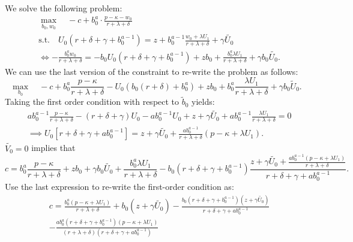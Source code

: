 \documentclass[12pt]{article} %
\theoremstyle{definition}
\begin{document}
\begin{appendix}
\noindent We solve the following problem:  
\begin{align*}
& \max_{b_0,w_0} \quad -c + b_0^a \cdot \frac{p-\kappa-w_0}{r+\lambda+\delta} \\
& \text{s.t.} \quad U_0(r+\delta+\gamma+b_0^{a-1}) = z + b_0^{a-1} \frac{w_0+\lambda U_1}{r+\lambda+\delta} + \gamma \tilde{U_0} \\
& \iff - \frac{b_0^{a}w_0}{r+\lambda+\delta} = - b_0 U_0(r+\delta+\gamma+b_0^{a-1}) + zb_0 +  \frac{b_0^{a} \lambda U_1}{r+\lambda+\delta} +  \gamma b_0 \tilde{U_0}.    
\end{align*}
We can use the last version of the constraint to re-write the problem as follows: 
\begin{equation*}
\max_{b_0} \quad -c + b_0^a \frac{p-\kappa}{r+\lambda+\delta} - U_0(b_0(r+
\delta)+b_0^a) +  zb_0 +b_0^a \frac{\lambda U_1}{r+\lambda+\delta} + \gamma b_0 \tilde{U}_0.
\end{equation*}
Taking the first order condition with respect to $\tilde{b}_0$ yields: 
\begin{align*}
& a b_0^{a-1}\frac{p-\kappa}{r+\lambda+\delta} - (r+\delta+\gamma) U_0 - a b_0^{a-1}U_0 + z + \gamma \tilde{U_0} + ab_0^{a-1} \frac{\lambda U_1}{r+\lambda+\delta} = 0 \\
& \implies U_0[r+\delta+\gamma+ab_0^{a-1}] = z + \gamma \tilde{U_0} + \frac{a b_0^{a-1}}{r+\lambda+\delta}(p-\kappa+\lambda U_1). 
\end{align*}
$\tilde{V_0}=0$ implies that
\begin{equation*}
 c =  b_0^{a} \frac{p-\kappa}{r+\lambda+\delta} + z b_0 + \gamma b_0 \tilde{U_0} + \frac{b_0^{a}\lambda U_1}{r+\lambda+\delta} -b_0(r+\delta+\gamma+b_0^{a-1}) \frac{z+\gamma \tilde{U_0} + \frac{ab_0^{a-1}(p-\kappa+\lambda U_1)}{r+\lambda+\delta}}{r+\delta+\gamma+ab_0^{a-1}}.
\end{equation*}
Use the last expression to re-write the first-order condition as: 
\begin{align*}
& c =  \frac{b_0^a(p-\kappa+\lambda U_1)}{r+\lambda+\delta} + {b}_0 (z+\gamma \tilde{U_0}) - \frac{b_0(r+\delta+\gamma+b_0^{a-1})(z+\gamma \tilde{U_0})}{r+\delta+\gamma+ab_0^{a-1}} \\
&- \frac{ab_0^a (r+\delta+\gamma+b_0^{a-1})(p-\kappa+\lambda U_1)}{({r+\lambda+\delta})(r+\delta+\gamma+ab_0^{a-1})} \\

\end{align*}
\end{appendix}
\end{document}
